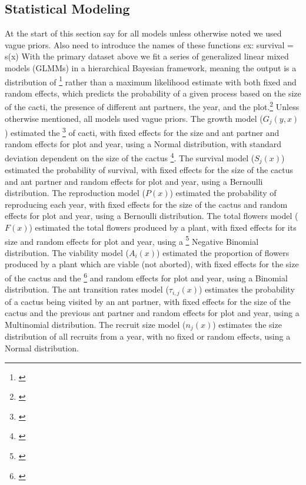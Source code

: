 \documentclass[12pt,a4paper]{article}
\newcommand{\tom}[2]{{\color{red}{#1}}\footnote{\textit{\color{red}{#2}}}}
\begin{document}
		\subsection*{Statistical Modeling}
		At the start of this section say for all models unless otherwise noted we used vague priors. 
		Also need to introduce the names of these functions ex: survival = s(x)
		With the primary dataset above we fit a series of generalized linear mixed models (GLMMs) in a hierarchical Bayesian framework, meaning the output is a distribution of \tom{the interaction between various factors on the highlighted variable}{confusing} rather than a maximum likelihood estimate with both fixed and random effects, which predicts the probability of a given process based on the size of the cacti, the presence of different ant partners, the year, and the plot.\tom{}{this is a confusing sentence. try to sharpen this.}
		Unless otherwise mentioned, all models used vague priors. 
		The growth model ($G_j(y,x)$) estimated the \tom{growth rate}{this is not what you modeled} of cacti, with fixed effects for the size and ant partner and random effects for plot and year, using a Normal distribution, with standard deviation dependent on the size of the cactus \tom{also with a Normal distribution}{??}. 
		The survival model ($S_j(x)$) estimated the probability of survival, with fixed effects for the size of the cactus and ant partner and random effects for plot and year, using a Bernoulli distribution. 
		The reproduction model ($P(x)$) estimated the probability of reproducing each year, with fixed effects for the size of the cactus and random effects for plot and year, using a Bernoulli distribution. 
		The total flowers model ($F(x)$) estimated the total flowers produced by a plant, with fixed effects for its size and random effects for plot and year, using a \tom{Truncated}{truncated how?} Negative Binomial distribution. 
		The viability model ($A_i(x)$) estimated the proportion of flowers produced by a plant which are viable (not aborted), with fixed effects for the size of the cactus and the \tom{presence of ant partners}{this is not the variable in the model} and random effects for plot and year, using a Binomial distribution.
		The ant transition rates model ($\tau_{i,j}(x)$) estimates the probability of a cactus being visited by an ant partner, with fixed effects for the size of the cactus and the previous ant partner and random effects for plot and year, using a Multinomial distribution.  
		The recruit size model ($n_j(x)$) estimates the size distribution of all recruits from a year, with no fixed or random effects, using a Normal distribution. 
\end{document}
